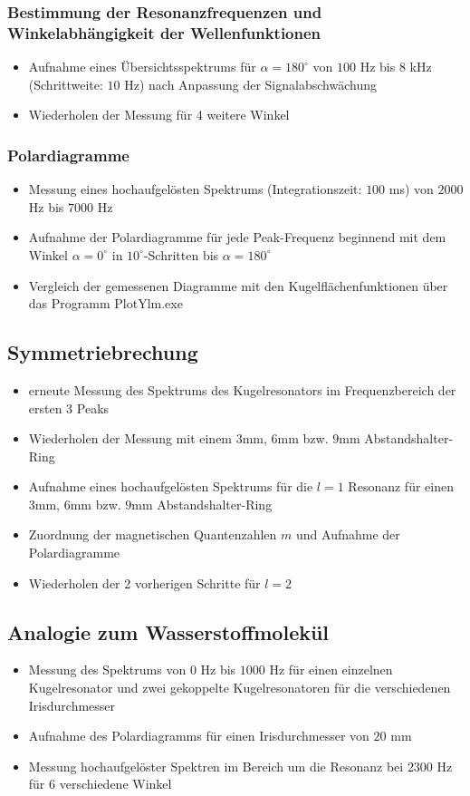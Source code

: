 \documentclass[german,  %
parskip=full,  %
]{scrartcl}
\begin{document}
\subsubsection{Bestimmung der Resonanzfrequenzen und Winkelabhängigkeit der Wellenfunktionen}
\begin{itemize}
\item Aufnahme eines Übersichtsspektrums für $\alpha = 180^{\circ}$ von $100$ Hz bis $8$ kHz (Schrittweite: $10$ Hz) nach Anpassung der Signalabschwächung
\item Wiederholen der Messung für 4 weitere Winkel
\end{itemize}
\subsubsection{Polardiagramme}
\begin{itemize}
\item Messung eines hochaufgelösten Spektrums (Integrationszeit: $100$ ms) von $2000$ Hz bis $7000$ Hz
\item Aufnahme der Polardiagramme für jede Peak-Frequenz beginnend mit dem Winkel $\alpha=0^{\circ}$ in $10^{\circ}$-Schritten bis $\alpha=180^{\circ}$
\item Vergleich der gemessenen Diagramme mit den Kugelflächenfunktionen über das Programm PlotYlm.exe
\end{itemize}
\subsection{Symmetriebrechung}
\begin{itemize}
\item erneute Messung des Spektrums des Kugelresonators im Frequenzbereich der ersten 3 Peaks
\item Wiederholen der Messung mit einem $3$mm, $6$mm bzw. $9$mm Abstandshalter-Ring
\item Aufnahme eines hochaufgelösten Spektrums für die $l=1$ Resonanz für einen $3$mm, $6$mm bzw. $9$mm Abstandshalter-Ring
\item Zuordnung der magnetischen Quantenzahlen $m$ und Aufnahme der Polardiagramme 
\item Wiederholen der 2 vorherigen Schritte für $l=2$
\end{itemize}
\subsection{Analogie zum Wasserstoffmolekül}
\begin{itemize}
\item Messung des Spektrums von $0$ Hz bis $1000$ Hz für einen einzelnen Kugelresonator und zwei gekoppelte Kugelresonatoren für die verschiedenen Irisdurchmesser
\item Aufnahme des Polardiagramms für einen Irisdurchmesser von $20$ mm
\item Messung hochaufgelöster Spektren im Bereich um die Resonanz bei $2300$ Hz für 6 verschiedene Winkel 
\end{itemize}
\end{document}
